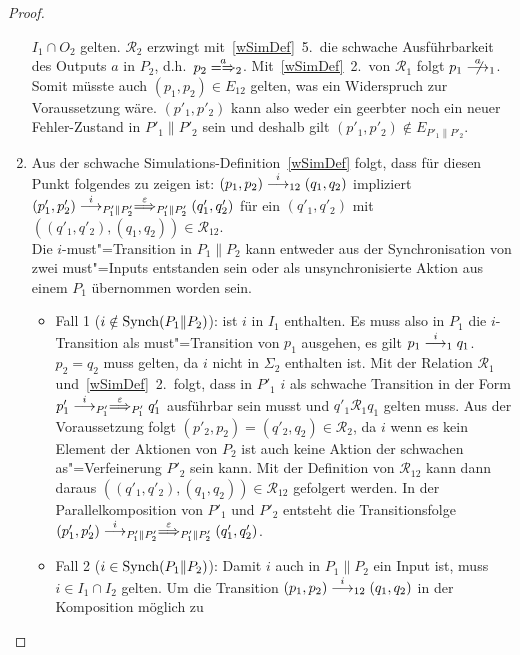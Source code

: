 \begin{proof}
\begin{enumerate}
      $I_1\cap O_2$ gelten. $\mathcal{R}_2$ erzwingt mit~\ref{wSimDef}~5.\ die
      schwache Ausführbarkeit des Outputs $a$ in $P_2$, d.h.\ $p_2
      \weakmay[a]_2$. Mit~\ref{wSimDef}~2.\ von $\mathcal{R}_1$ folgt $p_1
      \nmust[a]_1$. Somit müsste auch $(p_1,p_2)\in E_{12}$ gelten, was ein
      Widerspruch zur Voraussetzung wäre. $(p'_1,p'_2)$ kann also weder ein
      geerbter noch ein neuer Fehler-Zustand in $P'_1\|P'_2$ sein und deshalb
      gilt $(p'_1,p'_2)\notin E_{P'_1\|P'_2}$.
    \item Aus der schwache Simulations-Definition~\ref{wSimDef} folgt, dass für
      diesen Punkt folgendes zu zeigen ist: $(p_1,p_2)\must[i]_{12}(q_1,q_2)$
      impliziert $(p'_1,p'_2) \must[i]_{P'_1\|P'_2}
      \weakmust[\varepsilon]_{P'_1\|P'_2} (q'_1,q'_2)$ für ein $(q'_1,q'_2)$
      mit $((q'_1,q'_2),(q_1,q_2))\in\mathcal{R}_{12}$.\\
      Die $i$-must"=Transition in $P_1\|P_2$ kann entweder aus der
      Synchronisation von zwei must"=Inputs entstanden sein oder als
      unsynchronisierte Aktion aus einem $P_1$ übernommen worden sein.
      \begin{itemize}
        \item Fall 1 ($i\notin\mathrm{Synch} (P_1\|P_2)$): \OBdA{} ist $i$ in $I_1$
          enthalten. Es muss also in $P_1$ die $i$-Transition als
          must"=Transition von $p_1$ ausgehen, es gilt $p_1\must[i]_1 q_1$.
          $p_2=q_2$ muss gelten, da $i$ nicht in $\Sigma _2$ enthalten ist. Mit
          der Relation $\mathcal{R}_1$ und~\ref{wSimDef}~2.\ folgt, dass in
          $P'_1$ $i$ als schwache Transition in der Form $p'_1\must[i]_{P'_1}
          \weakmust[\varepsilon]_{P'_1}q'_1$ ausführbar sein musst und $q'_1
          \mathcal{R}_1q_1$ gelten muss. Aus der Voraussetzung folgt
          $(p'_2,p_2)=(q'_2,q_2)\in\mathcal{R}_2$, da $i$ wenn es kein Element
          der Aktionen von $P_2$ ist auch keine Aktion der schwachen
          as"=Verfeinerung $P'_2$ sein kann. Mit der Definition von
          $\mathcal{R}_{12}$ kann dann daraus $((q'_1,q'_2),(q_1,q_2)) \in
          \mathcal{R}_{12}$ gefolgert werden. In der Parallelkomposition von
          $P'_1$ und $P'_2$ entsteht die Transitionsfolge
          $(p'_1,p'_2)\must[i]_{P'_1\|P'_2} \weakmust[\varepsilon]_{P'_1\|P'_2}
          (q'_1,q'_2)$.
        \item Fall 2 ($i\in\mathrm{Synch} (P_1\|P_2)$): Damit $i$ auch in $P_1\|P_2$
          ein Input ist, muss $i\in I_1\cap I_2$ gelten. Um die Transition
          $(p_1,p_2)\must[i]_{12}(q_1,q_2)$ in der Komposition möglich zu

\end{itemize}
\end{enumerate}
\end{proof}
